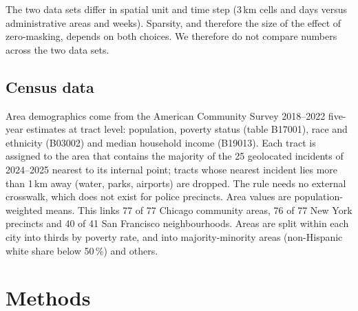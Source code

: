 \documentclass[preprint,12pt,authoryear]{elsarticle}
\begin{document}
The two data sets differ in spatial unit and time step (3\,km cells and days versus administrative areas and weeks). Sparsity, and therefore the size of the effect of zero-masking, depends on both choices. We therefore do not compare numbers across the two data sets.

\subsection{Census data}
Area demographics come from the American Community Survey 2018--2022 five-year estimates at tract level: population, poverty status (table B17001), race and ethnicity (B03002) and median household income (B19013). Each tract is assigned to the area that contains the majority of the 25 geolocated incidents of 2024--2025 nearest to its internal point; tracts whose nearest incident lies more than 1\,km away (water, parks, airports) are dropped. The rule needs no external crosswalk, which does not exist for police precincts. Area values are population-weighted means. This links 77 of 77 Chicago community areas, 76 of 77 New York precincts and 40 of 41 San Francisco neighbourhoods. Areas are split within each city into thirds by poverty rate, and into majority-minority areas (non-Hispanic white share below 50\,\%) and others.

\section{Methods}\label{sec:methods}
\end{document}
